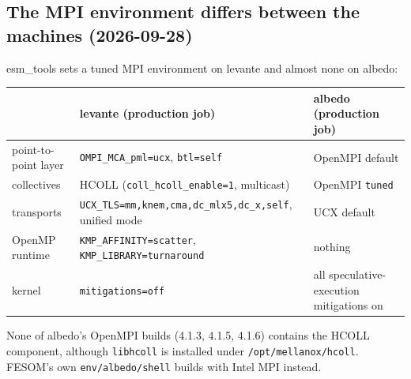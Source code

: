 \documentclass[11pt,a4paper]{article}
\begin{document}
\subsection{The MPI environment differs between the machines (2026-09-28)}
esm\_tools sets a tuned MPI environment on levante and almost none on albedo:
\begin{table}[H]\centering\small
\begin{tabular}{lll}\toprule
 & levante (production job) & albedo (production job)\\\midrule
point-to-point layer & \texttt{OMPI\_MCA\_pml=ucx}, \texttt{btl=self} & OpenMPI default\\
collectives & HCOLL (\texttt{coll\_hcoll\_enable=1}, multicast) & OpenMPI \texttt{tuned}\\
transports & \texttt{UCX\_TLS=mm,knem,cma,dc\_mlx5,dc\_x,self}, unified mode & UCX default\\
OpenMP runtime & \texttt{KMP\_AFFINITY=scatter}, \texttt{KMP\_LIBRARY=turnaround} & nothing\\
kernel & \texttt{mitigations=off} & all speculative-execution mitigations on\\\bottomrule
\end{tabular}
\end{table}
None of albedo's OpenMPI builds (4.1.3, 4.1.5, 4.1.6) contains the HCOLL component, although \texttt{libhcoll} is installed under \texttt{/opt/mellanox/hcoll}. FESOM's own \texttt{env/albedo/shell} builds with Intel MPI instead.
\end{document}
